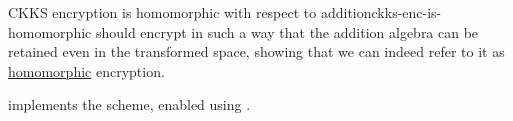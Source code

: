 \begin{theorem}{CKKS encryption is homomorphic with respect to addition}{ckks-enc-is-homomorphic}
   should encrypt in such a way that the addition algebra can be retained even in the transformed space, showing that we can indeed refer to it as \hyperref[def:ring-homomorphism]{homomorphic} encryption.
\end{theorem}


\cite{seal-4.0} implements the scheme, enabled using .
